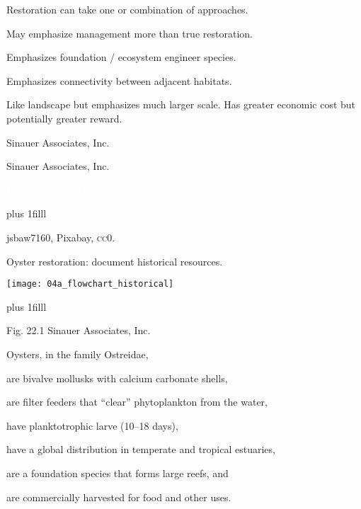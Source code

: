 \documentclass[t]{beamer}
\begin{document}
\begin{frame}[t]{Restoration can take one or combination of approaches.}

	\hangpara {} \onslide<2->May emphasize management more than true restoration.
	
	\hangpara {} \onslide<3->Emphasizes foundation / ecosystem engineer species.
	
	\hangpara {} \onslide<4->Emphasizes connectivity between adjacent habitats.
	
	\hangpara {} \onslide<5->Like landscape but emphasizes much larger scale. Has greater economic cost but potentially greater reward.
	
\end{frame}
%
{
\begin{frame}[b]

\tiny\textcopyright Sinauer Associates, Inc. 
\end{frame}
}
%
{
\begin{frame}[b]

\hfill\tiny\textcopyright Sinauer Associates, Inc. 
\end{frame}
}
%
{
\begin{frame}[t]{\textcolor{white}{Oysters: a case study in restoration ecology.}}

\vskip0pt plus 1filll

\hfill\tiny\textcopyright jsbaw7160, Pixabay, \textsc{cc0}. 
\end{frame}
}
%
\begin{frame}[t]{Oyster restoration: document historical resources.}

	\texttt{[image: 04a\_flowchart\_historical]}
	
	\vskip0pt plus 1filll

\hfill\tiny Fig. 22.1 \textcopyright Sinauer Associates, Inc. 
\end{frame}
%
\begin{frame}[t]{Oysters, in the family Ostreidae,}

	\hangpara are bivalve mollusks with calcium carbonate shells,
	
	\hangpara are filter feeders that “clear” phytoplankton from the water,
	
	\hangpara have planktotrophic larve (10--18 days),

	\hangpara have a global distribution in temperate and tropical estuaries,
	
	\hangpara are a foundation species that forms large reefs, and
	
	\hangpara are commercially harvested for food and other uses.
\end{frame}
\end{document}
